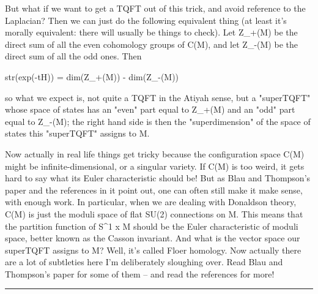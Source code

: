But what if we want to get a TQFT out of this trick, and avoid 
reference to the Laplacian?  Then we can just do the following equivalent
thing (at least it's morally equivalent: there will usually be things to
check).  Let Z_{+}(M) 
be the direct sum of all the even cohomology groups of
C(M), and let Z_{-}(M) be the direct sum of all the odd ones.  Then

str(exp(-tH)) = dim(Z_{+}(M)) - dim(Z_{-}(M))

so what we expect is, not quite a TQFT in the Atiyah sense, but
a "superTQFT" whose space of states has an "even" part equal
to Z_{+}(M) and an "odd" part equal to Z_{-}(M); 
the right hand side is then the "superdimension" of the space of states this
"superTQFT" assigns to M.

Now actually in real life things get tricky because the configuration
space C(M) might be infinite-dimensional, or a singular variety.
If C(M) is too weird, it gets hard to say what its Euler characteristic
should be!  But as Blau and Thompson's paper and the references in it
point out, one can often still make it make sense, with enough work.
In particular, when we are dealing with Donaldson theory, C(M) is
just the moduli space of flat SU(2) connections on M.  This means
that the partition function of S^{1} x M should be the Euler 
characteristic 
of moduli space, better known as the Casson invariant.  And what is
the vector space our superTQFT assigns to M?  Well, it's called
Floer homology.  Now actually there are a lot of subtleties here
I'm deliberately sloughing over.  Read Blau and Thompson's paper
for some of them -- and read the references for more!


\par\noindent\rule{\textwidth}{0.4pt}
